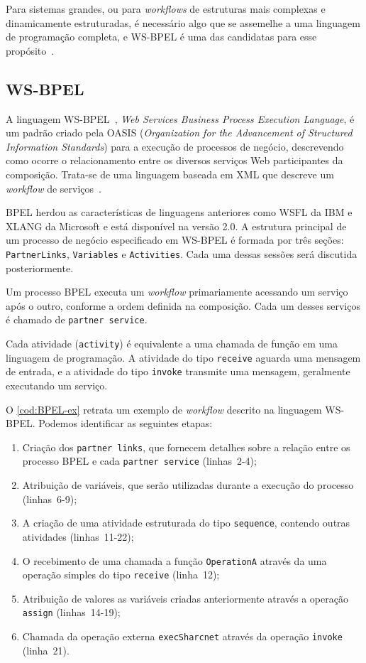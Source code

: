 \documentclass[12pt]{report} %
\begin{document}
	    Para sistemas grandes, ou para \textit{workflows} de estruturas mais complexas e dinamicamente estruturadas, é necessário algo que se assemelhe a uma linguagem de programação completa, e WS-BPEL é uma das candidatas para esse propósito~\cite{FOX06}.
                           
	\subsection{WS-BPEL}
	\label{subsec:BPEL}
	    A linguagem WS-BPEL~\cite{bpel:website}, \textit{Web Services Business Process Execution Language}, é um padrão criado pela OASIS (\textit{Organization for the Advancement of Structured Information Standards}) para a execução de processos de negócio, descrevendo como ocorre o relacionamento entre os diversos serviços Web participantes da composição.
	    Trata-se de uma linguagem baseada em XML que descreve um \textit{workflow} de serviços~\cite{MargolisSOA}.
				    
	    BPEL herdou as características de linguagens anteriores como WSFL da IBM e XLANG da Microsoft e está disponível na versão 2.0.
	    A estrutura principal de um processo de negócio especificado em WS-BPEL é formada por três seções: \texttt{PartnerLinks}, \texttt{Variables} e \texttt{Activities}.
	    Cada uma dessas sessões será discutida posteriormente.

	    Um processo BPEL executa um \textit{workflow} primariamente acessando um serviço após o outro, conforme a ordem definida na composição. 
	    Cada um desses serviços é chamado de \texttt{partner service}.

	    Cada atividade (\texttt{activity}) é equivalente a uma chamada de função em uma linguagem de programação.
	    A atividade do tipo \texttt{receive} aguarda uma mensagem de entrada, e a atividade do tipo \texttt{invoke} transmite uma mensagem, geralmente executando um serviço.  
	    
	    O \autoref{cod:BPEL-ex} retrata um exemplo de \textit{workflow} descrito na linguagem WS-BPEL.
	    Podemos identificar as seguintes etapas:
	    
	    \begin{enumerate}
		\item Criação dos \texttt{partner links}, que fornecem detalhes sobre a relação entre os processo BPEL e cada \texttt{partner service} (linhas~2-4);
		\item Atribuição de variáveis, que serão utilizadas durante a execução do processo (linhas~6-9);
		\item A criação de uma atividade estruturada do tipo \texttt{sequence}, contendo outras atividades (linhas~11-22);
		\item O recebimento de uma chamada a função \texttt{OperationA} através da uma operação simples do tipo \texttt{receive} (linha~12);
		\item Atribuição de valores as variáveis criadas anteriormente através a operação \texttt{assign} (linhas~14-19);
		\item Chamada da operação externa \texttt{execSharcnet} através da operação \texttt{invoke} (linha~21).
	    \end{enumerate}
\end{document}
